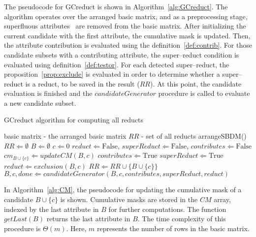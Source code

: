 \documentclass[number,preprint,review,12pt]{elsarticle}
\begin{document}
	\label{superfluous}
	The pseudocode for GCreduct is shown in Algorithm~\ref{alg:GCreduct}. The algorithm operates over the arranged basic matrix, and as a preprocessing stage, superfluous attributes~\cite{Lazo-Cortes2013} are removed from the basic matrix. After initializing the current candidate with the first attribute, the cumulative mask is updated. Then, the attribute contribution is evaluated using the definition~\ref{def:contrib}. For those candidate subsets with a contributing attribute, the super--reduct condition is evaluated using definition~\ref{def:testor}. For each detected super--reduct, the proposition~\ref{prop:exclude} is evaluated in order to determine whether a super--reduct is a reduct, to be saved in the result ($RR$). At this point, the candidate evaluation is finished and the $candidateGenerator$ procedure is called to evaluate a new candidate subset.
	
	\begin{algorithm}
	\footnotesize
	\caption{GCreduct algorithm for computing all reducts}
	\label{alg:GCreduct}
	\begin{algorithmic}[1]
		\Require basic matrix - the arranged basic matrix
		\Ensure $RR$ - set of all reducts
		\State arrangeSBDM()
		\State $RR \Leftarrow \emptyset$
		\State $B \Leftarrow \emptyset$  
		\State $c \Leftarrow 0$ 
			\State $reduct \Leftarrow \mathrm{False}$, $superReduct \Leftarrow \mathrm{False}$, $contributes \Leftarrow \mathrm{False}$
		  	\State $cm_{B\cup \lbrace c\rbrace} \Leftarrow updateCM(B,c)$
		  	\label{line:contrib}
		  		\State $contributes \Leftarrow \mathrm{True}$
		  		\label{line:superReduct}
		  			\State $superReduct \Leftarrow \mathrm{True}$
		  			\State $reduct \Leftarrow exclusion(B,c)$
		  				\State $RR \Leftarrow RR \cup \lbrace B\cup \lbrace c\rbrace \rbrace$
		  			\EndIf
		  		\EndIf
		  	\EndIf
			\State $B,c,done \Leftarrow candidateGenerator(B,c,contributes,superReduct,reduct)$
	\EndWhile 
		\end{algorithmic}
	\end{algorithm}
	
	In Algorithm~\ref{alg:CM}, the pseudocode for updating the cumulative mask of a candidate $B\cup\lbrace c\rbrace$ is shown. Cumulative masks are stored in the $CM$ array, indexed by the last attribute in $B$ for further computations. The function $getLast(B)$ returns the last attribute in $B$. The time complexity of this procedure is $\Theta(m)$. Here, $m$ represents the number of rows in the basic matrix.
		
\end{document}
